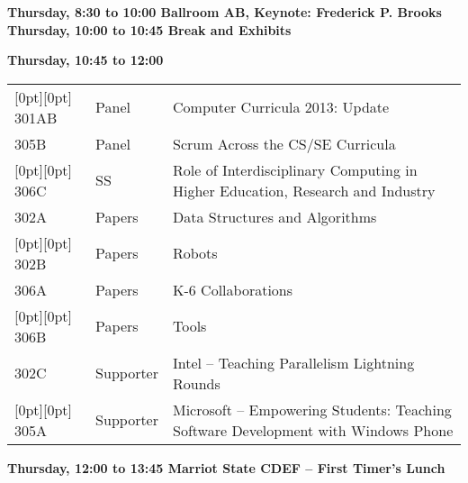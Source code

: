 
\noindent
{\sffamily\bfseries Thursday, 8:30 to 10:00 Ballroom AB, Keynote: Frederick P. Brooks}\newline\noindent
{\sffamily\bfseries Thursday, 10:00 to 10:45 Break and Exhibits}\newline\noindent

\noindent
{\sffamily\bfseries Thursday, 10:45 to 12:00}\newline\noindent
\begin{tabular*}{5in}{@{}p{0.5in}@{}p{0.75in}@{}p{3.75in}}

\rowcolor[gray]{0.9}[0pt][0pt] 301AB & Panel & Computer Curricula 2013:  Update \\

305B & Panel & Scrum Across the CS/SE Curricula \\

\rowcolor[gray]{0.9}[0pt][0pt] 306C & SS & Role of Interdisciplinary Computing in Higher Education, Research and Industry \\

302A & Papers & Data Structures and Algorithms \\

\rowcolor[gray]{0.9}[0pt][0pt] 302B & Papers & Robots \\

306A & Papers & K-6 Collaborations \\

\rowcolor[gray]{0.9}[0pt][0pt] 306B & Papers & Tools \\

302C & Supporter & Intel  -- Teaching Parallelism Lightning Rounds \\

\rowcolor[gray]{0.9}[0pt][0pt] 305A & Supporter & Microsoft -- Empowering Students: Teaching Software Development with Windows Phone 
\end{tabular*}
{\sffamily\bfseries Thursday, 12:00 to 13:45  Marriot State CDEF -- First Timer's Lunch}\newline

